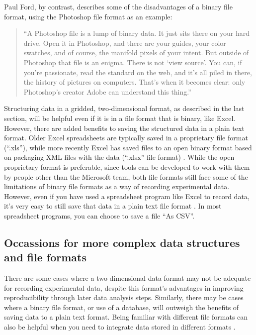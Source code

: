 \documentclass[]{tufte-book}
\begin{document}
\noindent Paul Ford, by contrast, describes some of the disadvantages of
a binary file format, using the Photoshop file format as an example:

\begin{quote}
``A Photoshop file is a lump of binary data. It just sits there on your hard
drive. Open it in Photoshop, and there are your guides, your color swatches, and
of course, the manifold pixels of your intent. But outside of Photoshop that
file is an enigma. There is not `view source'. You can, if you're passionate,
read the standard on the web, and it's all piled in there, the history of
pictures on computers. That's when it becomes clear: only Photoshop's creator
Adobe can understand this thing.'' \citep{ford2015on}
\end{quote}

Structuring data in a gridded, two-dimensional format, as described in the last
section, will be helpful even if it is in a file format that is binary, like
Excel. However, there are added benefits to saving the structured data in a
plain text format. Older Excel spreadsheets are typically saved in a proprietary
file format (``.xls''), while more recently Excel has saved files to an open
binary format based on packaging XML files with the data (``.xlsx'' file format)
\citep{janssens2014data}. While the open proprietary format is preferable, since
tools can be developed to work with them by people other than the Microsoft
team, both file formats still face some of the limitations of binary file
formats as a way of recording experimental data. However, even if you have used
a spreadsheet program like Excel to record data, it's very easy to still save
that data in a plain text file format \citep{murrell2009introduction}. In most
spreadsheet programs, you can choose to save a file ``As CSV''.

\hypertarget{occassions-for-more-complex-data-structures-and-file-formats}{%
\subsection{Occassions for more complex data structures and file formats}\label{occassions-for-more-complex-data-structures-and-file-formats}}

There are some cases where a two-dimensional data format may not be adequate
for recording experimental data, despite this format's advantages in
improving reproducibility through later data analysis steps. Similarly,
there may be cases where a binary file format, or use of a database, will
outweigh the benefits of saving data to a plain text format. Being familiar
with different file formats can also be helpful when you need to integrate
data stored in different formats \citep{murrell2009introduction}.
\end{document}
